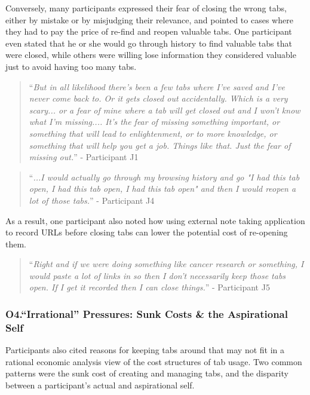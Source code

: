 
Conversely, many participants expressed their fear of closing the wrong tabs, either by mistake or by misjudging their relevance, and pointed to cases where they had to pay the price of re-find and reopen valuable tabs. One participant even stated that he or she would go through history to find valuable tabs that were closed, while others were willing lose information they considered valuable just to avoid having too many tabs. 

\begin{quote}
``\emph{But in all likelihood there's been a few tabs where I've saved and I've never come back to. Or it gets closed out accidentally. Which is a very scary... or a fear of mine where a tab will get closed out and I won't know what I'm missing.... It's the fear of missing something important, or something that will lead to enlightenment, or to more knowledge, or something that will help you get a job. Things like that. Just the fear of missing out.}'' - Participant J1
\end{quote}

\begin{quote}
``\emph{...I would actually go through my browsing history and go "I had this tab open, I had this tab open, I had this tab open" and then I would reopen a lot of those tabs.}'' - Participant J4
\end{quote}

As a result, one participant also noted how using external note taking application to record URLs before closing tabs can lower the potential cost of re-opening them.

\begin{quote}
``\emph{Right and if we were doing something like cancer research or something, I would paste a lot of links in so then I don't necessarily keep those tabs open. If I get it recorded then I can close things.}'' - Participant J5 
\end{quote}

\subsubsection{O4.``Irrational'' Pressures: Sunk Costs \& the Aspirational Self}

Participants also cited reasons for keeping tabs around that may not fit in a rational economic analysis view of the cost structures of tab usage. Two common patterns were the sunk cost of creating and managing tabs, and the disparity between a participant's actual and aspirational self.

